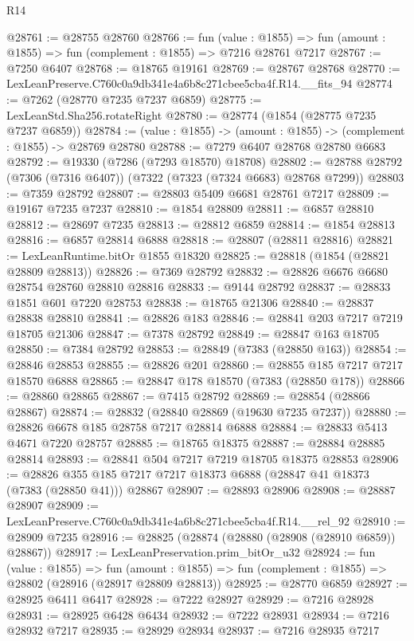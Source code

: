 \begin{lexlean}{R14}
\begin{coremodule}
@28761 := @28755 @28760
@28766 := fun (value : @1855) =>
  fun (amount : @1855) => fun (complement : @1855) => @7216 @28761 @7217
@28767 := @7250 @6407
@28768 := @18765 @19161
@28769 := @28767 @28768
@28770 := LexLeanPreserve.C760c0a9db341e4a6b8c271cbee5cba4f.R14.__fits_94
@28774 := @7262 (@28770 @7235 @7237 @6859)
@28775 := LexLeanStd.Sha256.rotateRight
@28780 := @28774 (@1854 (@28775 @7235 @7237 @6859))
@28784 := (value : @1855) -> (amount : @1855) -> (complement : @1855) -> @28769 @28780
@28788 := @7279 @6407 @28768 @28780 @6683
@28792 := @19330 (@7286 (@7293 @18570) @18708)
@28802 := @28788 @28792 (@7306 (@7316 @6407)) (@7322 (@7323 (@7324 @6683) @28768 @7299))
@28803 := @7359 @28792
@28807 := @28803 @5409 @6681 @28761 @7217
@28809 := @19167 @7235 @7237
@28810 := @1854 @28809
@28811 := @6857 @28810
@28812 := @28697 @7235
@28813 := @28812 @6859
@28814 := @1854 @28813
@28816 := @6857 @28814 @6888
@28818 := @28807 (@28811 @28816)
@28821 := LexLeanRuntime.bitOr @1855 @18320
@28825 := @28818 (@1854 (@28821 @28809 @28813))
@28826 := @7369 @28792
@28832 := @28826 @6676 @6680 @28754 @28760 @28810 @28816
@28833 := @9144 @28792
@28837 := @28833 @1851 @601 @7220 @28753
@28838 := @18765 @21306
@28840 := @28837 @28838 @28810
@28841 := @28826 @183
@28846 := @28841 @203 @7217 @7219 @18705 @21306
@28847 := @7378 @28792
@28849 := @28847 @163 @18705
@28850 := @7384 @28792
@28853 := @28849 (@7383 (@28850 @163))
@28854 := @28846 @28853
@28855 := @28826 @201
@28860 := @28855 @185 @7217 @7217 @18570 @6888
@28865 := @28847 @178 @18570 (@7383 (@28850 @178))
@28866 := @28860 @28865
@28867 := @7415 @28792
@28869 := @28854 (@28866 @28867)
@28874 := @28832 (@28840 @28869 (@19630 @7235 @7237))
@28880 := @28826 @6678 @185 @28758 @7217 @28814 @6888
@28884 := @28833 @5413 @4671 @7220 @28757
@28885 := @18765 @18375
@28887 := @28884 @28885 @28814
@28893 := @28841 @504 @7217 @7219 @18705 @18375 @28853
@28906 := @28826 @355 @185 @7217 @7217 @18373 @6888 (@28847 @41 @18373 (@7383 (@28850 @41))) @28867
@28907 := @28893 @28906
@28908 := @28887 @28907
@28909 := LexLeanPreserve.C760c0a9db341e4a6b8c271cbee5cba4f.R14.__rel_92
@28910 := @28909 @7235
@28916 := @28825 (@28874 (@28880 (@28908 (@28910 @6859)) @28867))
@28917 := LexLeanPreservation.prim_bitOr_u32
@28924 := fun (value : @1855) =>
  fun (amount : @1855) => fun (complement : @1855) => @28802 (@28916 (@28917 @28809 @28813))
@28925 := @28770 @6859
@28927 := @28925 @6411 @6417
@28928 := @7222 @28927
@28929 := @7216 @28928
@28931 := @28925 @6428 @6434
@28932 := @7222 @28931
@28934 := @7216 @28932 @7217
@28935 := @28929 @28934
@28937 := @7216 @28935 @7217

\end{coremodule}
\end{lexlean}
